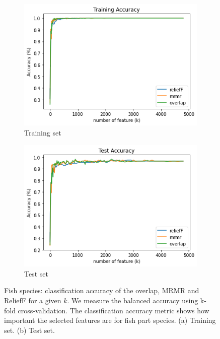 \documentclass{article}
\begin{document}
\begin{figure}[htb]
  \centering
  \begin{subfigure}[b]{\linewidth}
    \includegraphics[width=1\linewidth]{fish_k_accuracy_train.png}
    \caption{Training set}
    \label{fig:fish-k-accuracy-train}
  \end{subfigure}

  \begin{subfigure}[b]{\linewidth}
    \includegraphics[width=1\linewidth]{fish_k_accuracy_test.png}
    \caption{Test set}
    \label{fig:fish-k-accuracy-test}
  \end{subfigure}
  \caption[Two numerical solutions]{
    Fish species: classification accuracy of the overlap, MRMR and ReliefF for a given $k$.
    We measure the balanced accuracy using k-fold cross-validation.
    The classification accuracy metric shows how important the selected features are for fish part species.
    (a) Training set. (b) Test set.}
\end{figure}
\end{document}
